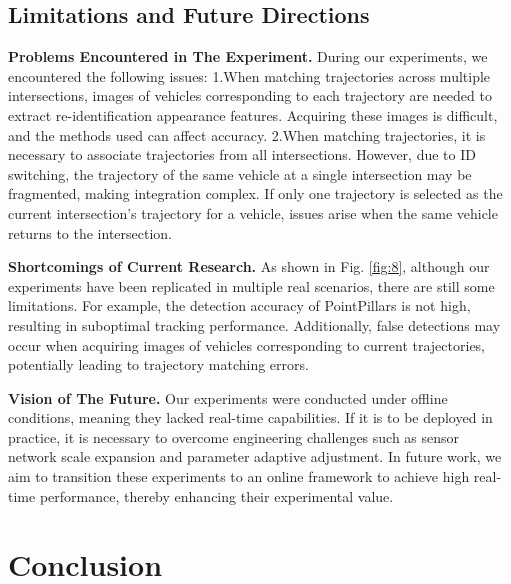 \documentclass[lettersize,journal]{IEEEtran}
\begin{document}
\subsection{Limitations and Future Directions}

\textbf{Problems Encountered in The Experiment.}
During our experiments, we encountered the following issues: 
1.When matching trajectories across multiple intersections, images of vehicles corresponding to each trajectory are needed to extract re-identification appearance features. 
Acquiring these images is difficult, and the methods used can affect accuracy. 
2.When matching trajectories, it is necessary to associate trajectories from all intersections. 
However, due to ID switching, the trajectory of the same vehicle at a single intersection may be fragmented, making integration complex. 
If only one trajectory is selected as the current intersection's trajectory for a vehicle, issues arise when the same vehicle returns to the intersection.

\textbf{Shortcomings of Current Research.}
As shown in Fig. \ref{fig:8}, although our experiments have been replicated in multiple real scenarios, there are still some limitations.
For example, the detection accuracy of PointPillars is not high, resulting in suboptimal tracking performance. 
Additionally, false detections may occur when acquiring images of vehicles corresponding to current trajectories, potentially leading to trajectory matching errors.

\textbf{Vision of The Future.}
Our experiments were conducted under offline conditions, meaning they lacked real-time capabilities. 
If it is to be deployed in practice, it is necessary to overcome engineering challenges such as sensor network scale expansion and parameter adaptive adjustment.
In future work, we aim to transition these experiments to an online framework to achieve high real-time performance, thereby enhancing their experimental value.


\section{Conclusion}
\end{document}
